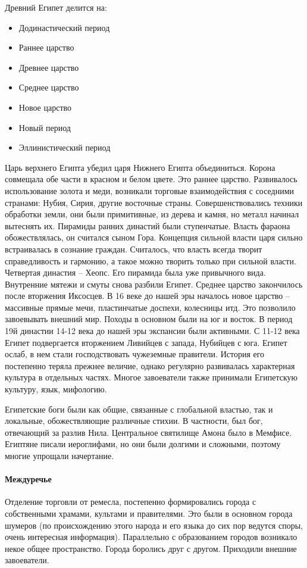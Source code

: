 \documentclass[a4paper, 12pt]{article}
\begin{document}
\begin{multicols}{2}
Древний Египет делится на:
\begin{itemize}[noitemsep]
\item Додинастический период
\item Раннее царство
\item Древнее царство
\item Среднее царство
\item Новое царство
\item Новый период
\item Эллинистический период
\end{itemize}
Царь верхнего Египта убедил царя Нижнего Египта объединиться. Корона совмещала обе части в красном и белом цвете. Это раннее царство. Развивалось использование золота и меди, возникали торговые взаимодействия с соседними странами: Нубия, Сирия, другие восточные страны. Совершенствовались техники обработки земли, они были примитивные, из дерева и камня, но металл начинал вытеснять их. Пирамиды ранних династий были ступенчатые. Власть фараона обожествлялась, он считался сыном Гора. Концепция сильной власти царя сильно встраивалась в сознание граждан. Считалось, что власть всегда творит справедливость и гармонию, а такое можно творить только при сильной власти. Четвертая династия -- Хеопс. Его пирамида была уже привычного вида. Внутренние мятежи и смуты снова разбили Египет. Среднее царство закончилось после вторжения Иксосцев. В 16 веке до нашей эры началось новое царство -- массивные прямые мечи, пластинчатые доспехи, колесницы итд. Это позволило завоевывать внешний мир. Походы в основном были на юг и восток. В период 19й династии 14-12 века до нашей эры экспансии были активными. С 11-12 века Египет подвергается вторжением Ливийцев с запада, Нубийцев с юга. Египет ослаб, в нем стали господствовать чужеземные правители. История его постепенно теряла прежнее величие, однако регулярно развивалась характерная культура в отдельных частях. Многое завоеватели также принимали Египетскую культуру, язык, мифологию. 

Египетские боги были как общие, связанные с глобальной властью, так и локальные, обожествляющие различные стихии. В частности, был бог, отвечающий за разлив Нила. Центральное святилище Амона было в Мемфисе. Египтяне писали иероглифами, но они были долгими и сложными, поэтому многие упрощали начертание. 

\paragraph{Междуречье} Отделение торговли от ремесла, постепенно формировались города с собственными храмами, культами и правителями. Это были в основном города шумеров (по происхождению этого народа и его языка до сих пор ведутся споры, очень интересная информация). Параллельно с образованием городов возникало некое общее пространство. Города боролись друг с другом. Приходили внешние завоеватели. 


\end{multicols}
\end{document}

